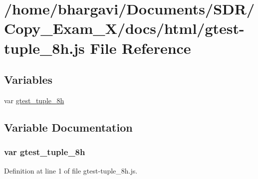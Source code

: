 \hypertarget{gtest-tuple__8h_8js}{}\section{/home/bhargavi/\+Documents/\+S\+D\+R/\+Copy\+\_\+\+Exam\+\_\+X/docs/html/gtest-\/tuple\+\_\+8h.js File Reference}
\label{gtest-tuple__8h_8js}
\subsection*{Variables}
\begin{DoxyCompactItemize}
\item 
var \hyperlink{gtest-tuple__8h_8js_af32854f56552758b7cf2f09260d14dbf}{gtest\+\_\+tuple\+\_\+8h}
\end{DoxyCompactItemize}


\subsection{Variable Documentation}
\subsubsection[{\texorpdfstring{gtest\+\_\+tuple\+\_\+8h}{gtest_tuple_8h}}]{\setlength{\rightskip}{0pt plus 5cm}var gtest\+\_\+tuple\+\_\+8h}\hypertarget{gtest-tuple__8h_8js_af32854f56552758b7cf2f09260d14dbf}{}\label{gtest-tuple__8h_8js_af32854f56552758b7cf2f09260d14dbf}


Definition at line 1 of file gtest-\/tuple\+\_\+8h.\+js.

